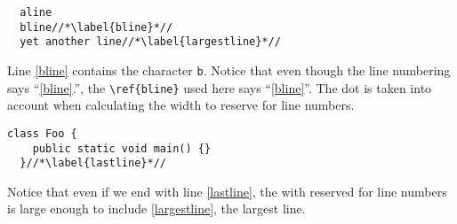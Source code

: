 \documentclass{article}
\begin{document}

\parindent 0pt


\begin{lstlisting}
  aline
  bline//*\label{bline}*//
  yet another line//*\label{largestline}*//
\end{lstlisting}

Line \ref{bline} contains the character \verb!b!. Notice that even
though the line numbering says ``\ref{bline}.'', the
\verb!\ref{bline}! used here says ``\ref{bline}''. The dot is taken
into account when calculating the width to reserve for line numbers.

\begin{lstlisting}[firstnumber=123]
  class Foo {
    public static void main() {}
  }//*\label{lastline}*//
\end{lstlisting}

Notice that even if we end with line \ref{lastline}, the with reserved
for line numbers is large enough to include \ref{largestline}, the
largest line.

\lipsum[2]
\end{document}

